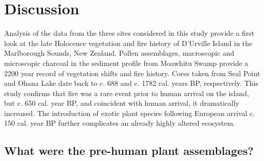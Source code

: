 \documentclass{article}
\begin{document}

\section{Discussion}

Analysis of the data from the three sites considered in this study provide a first look at the late Holocence vegetation and fire history of D'Urville Island in the Marlborough Sounds, New Zealand. Pollen assemblages, macroscopic and microscopic charcoal in the sediment profile from Moawhitu Swamp provide a 2200 year record of vegetation shifts and fire history.  Cores taken from Seal Point and Ohana Lake date back to c. 688 and c. 1782 cal. years BP, respectively. This study confirms that fire was a rare event prior to human arrival on the island, but c. 650 cal. year BP, and coincident with human arrival, it dramatically increased.  The introduction of exotic plant species following European arrival c. 150 cal. year BP further complicates an already highly altered ecosystem.

\subsection{What were the pre-human plant assemblages?}
\end{document}
